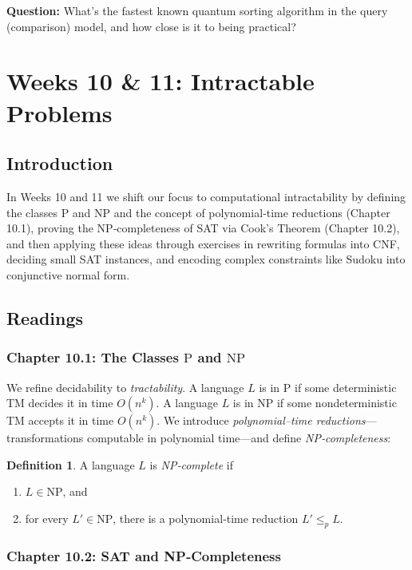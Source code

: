 \documentclass{article}
\theoremstyle{theorem}
\theoremstyle{definition}
\newtheorem{definition}[theorem]{Definition}
\theoremstyle{remark}
\begin{document}
\textbf{Question:} What’s the fastest known quantum sorting algorithm in the query (comparison) model, and how close is it to being practical?

\section{Weeks 10 \& 11: Intractable Problems}

\subsection{Introduction}
In Weeks 10 and 11 we shift our focus to computational intractability by defining the classes P and NP and the concept of polynomial‐time reductions (Chapter 10.1), proving the NP‐completeness of SAT via Cook’s Theorem (Chapter 10.2), and then applying these ideas through exercises in rewriting formulas into CNF, deciding small SAT instances, and encoding complex constraints like Sudoku into conjunctive normal form.

\subsection{Readings}

\subsubsection*{Chapter 10.1: The Classes \(\mathrm{P}\) and \(\mathrm{NP}\)}  
We refine decidability to \emph{tractability}.  A language \(L\) is in
\(\mathrm{P}\) if some deterministic TM decides it in time \(O(n^k)\).  A
language \(L\) is in \(\mathrm{NP}\) if some nondeterministic TM accepts
it in time \(O(n^k)\).  We introduce \emph{polynomial–time reductions}—
transformations computable in polynomial time—and define \emph{NP‐completeness}:

\begin{definition}
A language \(L\) is \emph{NP‐complete} if
\begin{enumerate}
  \item \(L\in\mathrm{NP}\), and
  \item for every \(L'\in\mathrm{NP}\), there is a polynomial‐time reduction
    \(L'\le_p L\).
\end{enumerate}
\end{definition}

\subsubsection*{Chapter 10.2: SAT and NP‐Completeness}\label{sec:chapter10.2}
\end{document}
